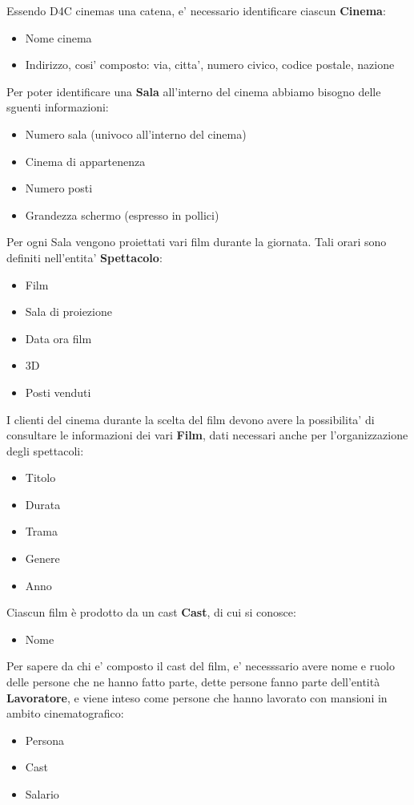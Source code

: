 \documentclass[10pt]{article}
\begin{document}
	Essendo D4C cinemas una catena, e' necessario identificare ciascun {\bf Cinema}:
	\begin{itemize}
		\item Nome cinema
		\item Indirizzo, cosi' composto: via, citta', numero civico, codice postale, nazione
	\end{itemize}
	Per poter identificare una {\bf Sala} all'interno del cinema abbiamo bisogno delle sguenti informazioni:
	\begin{itemize}
		\item Numero sala (univoco all'interno del cinema)
		\item Cinema di appartenenza
		\item Numero posti
		\item Grandezza schermo (espresso in pollici)
	\end{itemize}
	Per ogni Sala vengono proiettati vari film durante la giornata. Tali orari sono definiti nell'entita' {\bf Spettacolo}:
	\begin{itemize}
		\item Film
		\item Sala di proiezione
	    \item Data ora film
	    \item 3D
	    \item Posti venduti
	\end{itemize}
	I clienti del cinema durante la scelta del film devono avere la possibilita' di consultare le informazioni dei vari \textbf{Film}, dati necessari anche per l'organizzazione degli spettacoli:
	\begin{itemize}
		\item Titolo
		\item Durata
		\item Trama
		\item Genere
		\item Anno
	\end{itemize}
	Ciascun film è prodotto da un cast {\bf Cast}, di cui si conosce:
	\begin{itemize}
		\item Nome
	\end{itemize}
	Per sapere da chi e' composto il cast del film, e' necesssario avere nome e ruolo delle persone che ne hanno fatto parte, dette persone fanno parte dell'entità {\bf Lavoratore}, e viene inteso come persone che hanno lavorato con mansioni in ambito cinematografico:
	\begin{itemize}
		\item Persona
		\item Cast
		\item Salario
	\end{itemize}
\end{document}
